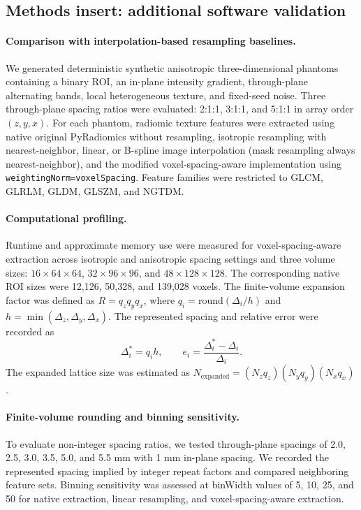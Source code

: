 \subsection*{Methods insert: additional software validation}
\paragraph{Comparison with interpolation-based resampling baselines.}
We generated deterministic synthetic anisotropic three-dimensional phantoms containing a binary ROI, an in-plane intensity gradient, through-plane alternating bands, local heterogeneous texture, and fixed-seed noise. Three through-plane spacing ratios were evaluated: 2:1:1, 3:1:1, and 5:1:1 in array order $(z,y,x)$. For each phantom, radiomic texture features were extracted using native original PyRadiomics without resampling, isotropic resampling with nearest-neighbor, linear, or B-spline image interpolation (mask resampling always nearest-neighbor), and the modified voxel-spacing-aware implementation using \texttt{weightingNorm=voxelSpacing}. Feature families were restricted to GLCM, GLRLM, GLDM, GLSZM, and NGTDM.

\paragraph{Computational profiling.}
Runtime and approximate memory use were measured for voxel-spacing-aware extraction across isotropic and anisotropic spacing settings and three volume sizes: $16\times64\times64$, $32\times96\times96$, and $48\times128\times128$. The corresponding native ROI sizes were 12,126, 50,328, and 139,028 voxels. The finite-volume expansion factor was defined as $R=q_z q_y q_x$, where $q_i=\mathrm{round}(\Delta_i/h)$ and $h=\min(\Delta_z,\Delta_y,\Delta_x)$. The represented spacing and relative error were recorded as
\[
\Delta_i^*=q_i h,\qquad e_i=\frac{\Delta_i^*-\Delta_i}{\Delta_i}.
\]
The expanded lattice size was estimated as $N_{\mathrm{expanded}}=(N_zq_z)(N_yq_y)(N_xq_x)$.

\paragraph{Finite-volume rounding and binning sensitivity.}
To evaluate non-integer spacing ratios, we tested through-plane spacings of 2.0, 2.5, 3.0, 3.5, 5.0, and 5.5 mm with 1 mm in-plane spacing. We recorded the represented spacing implied by integer repeat factors and compared neighboring feature sets. Binning sensitivity was assessed at binWidth values of 5, 10, 25, and 50 for native extraction, linear resampling, and voxel-spacing-aware extraction.

